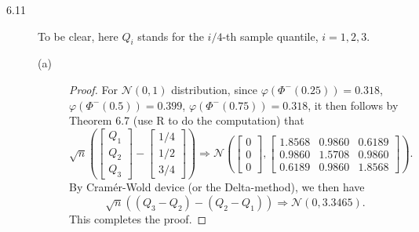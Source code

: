 \documentclass{article}
\newcommand{\gaussian}{\mathcal{N}}
\theoremstyle{definition}
\theoremstyle{plain}
\theoremstyle{remark}
\begin{document}
\begin{description}
\item[6.11]
To be clear, here $Q_i$ stands for the $i/4$-th sample quantile, $i = 1, 2, 3$.
\begin{description}
\item[(a)]
\begin{proof}
For $\gaussian(0, 1)$ distribution, since $\varphi(\Phi^{-}(0.25)) = 0.318$,
$\varphi(\Phi^{-}(0.5)) = 0.399$, 
$\varphi(\Phi^{-}(0.75)) = 0.318$, it then follows by Theorem 6.7 (use
R to do the computation) that
\begin{equation*}
    \sqrt{n}\left(
    \begin{bmatrix}
    Q_1 \\
    Q_2 \\
    Q_3
    \end{bmatrix} -
    \begin{bmatrix}
    1/4 \\
    1/2 \\
    3/4
    \end{bmatrix}\right) \Rightarrow 
    \gaussian\left(
    \begin{bmatrix}
    0 \\
    0 \\
    0
    \end{bmatrix},
    \begin{bmatrix}
    1.8568 & 0.9860 & 0.6189 \\
    0.9860 & 1.5708 & 0.9860 \\
    0.6189 & 0.9860 & 1.8568
    \end{bmatrix}
    \right).
\end{equation*}
By Cram\'{e}r-Wold device (or the Delta-method), we then have
\begin{equation*}
    \sqrt{n}((Q_3 - Q_2) - (Q_2 - Q_1)) \Rightarrow 
    \gaussian(0, 3.3465).
\end{equation*}
This completes the proof.
\end{proof}


\end{description}
\end{description}
\end{document}
